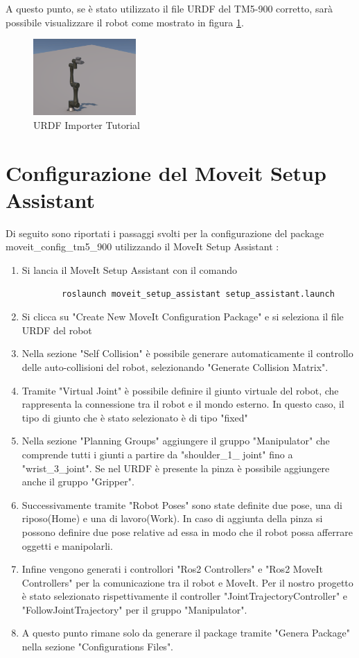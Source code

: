 \documentclass[11pt]{report}
\begin{document}
A questo punto, se è stato utilizzato il file URDF del TM5-900 corretto, sarà possibile visualizzare il robot come mostrato in figura \ref{fig:URDF_Importer_7}.
\begin{figure}[H]
    \centering
    \includegraphics[width=0.35\textwidth]{images/URDF_Importer_7.png}
    \caption{URDF Importer Tutorial}
    \label{fig:URDF_Importer_7}     
\end{figure}

\section{Configurazione del Moveit Setup Assistant}
\label{sec:moveit_setup_assistant}
Di seguito sono riportati i passaggi svolti per la configurazione del package moveit\_config\_tm5\_900 utilizzando il MoveIt Setup Assistant \cite{Moveit_tutorial}: 
\begin{enumerate}
    \item Si lancia il MoveIt Setup Assistant con il comando \begin{verbatim}
        roslaunch moveit_setup_assistant setup_assistant.launch
    \end{verbatim}
    \item Si clicca su "Create New MoveIt Configuration Package" e si seleziona il file URDF del robot
    \item Nella sezione "Self Collision" è possibile generare automaticamente il controllo delle auto-collisioni del robot, selezionando "Generate Collision Matrix".
    \item Tramite "Virtual Joint" è possibile definire il giunto virtuale del robot, che rappresenta la connessione tra il robot e il mondo esterno. In questo caso, il tipo di giunto che è stato selezionato è di tipo "fixed"
    \item Nella sezione "Planning Groups" aggiungere il gruppo "Manipulator" che comprende tutti i giunti a partire da "shoulder\_1\_ joint" fino a "wrist\_3\_joint". Se nel URDF è presente la pinza è possibile aggiungere anche il gruppo "Gripper".
    \item Successivamente tramite "Robot Poses" sono state definite due pose, una di riposo(Home) e una di lavoro(Work). In caso di aggiunta della pinza si possono definire due pose relative ad essa in modo che il robot possa afferrare oggetti e manipolarli.
    \item Infine vengono generati i controllori "Ros2 Controllers" e "Ros2 MoveIt Controllers" per la comunicazione tra il robot e MoveIt. Per il nostro progetto è stato selezionato rispettivamente il controller "JointTrajectoryController" e "FollowJointTrajectory" per il gruppo "Manipulator".
    \item A questo punto rimane solo da generare il package tramite "Genera Package" nella sezione "Configurations Files".
\end{enumerate}
\end{document}
